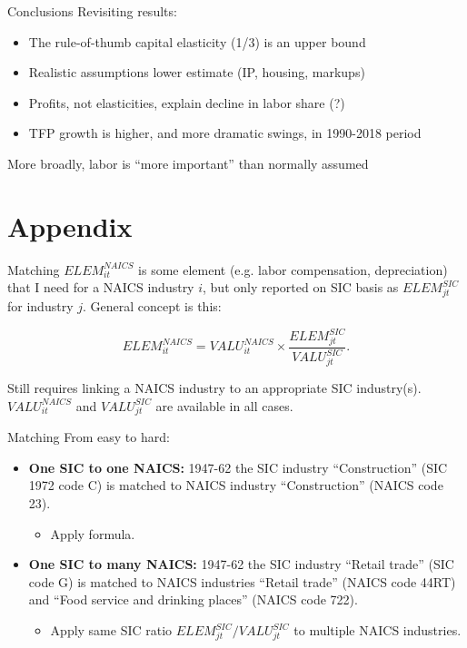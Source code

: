 \documentclass[10pt,xcolor=dvipsnames]{beamer}
\begin{document}
\begin{frame}{Conclusions}
Revisiting results:
\begin{itemize}
  \item The rule-of-thumb capital elasticity (1/3) is an upper bound
  \item Realistic assumptions lower estimate (IP, housing, markups)
  \item Profits, not elasticities, explain decline in labor share (?)
  \item TFP growth is higher, and more dramatic swings, in 1990-2018 period
\end{itemize}

\vspace{.25in}
More broadly, labor is ``more important'' than normally assumed
\end{frame}

\section{Appendix}

\begin{frame}{Matching}\label{Amatch}
$ELEM_{it}^{NAICS}$ is some element (e.g. labor compensation, depreciation) that I need for a NAICS industry $i$, but only reported on SIC basis as $ELEM_{jt}^{SIC}$ for industry $j$. General concept is this:

\begin{equation}
  ELEM_{it}^{NAICS} = VALU_{it}^{NAICS} \times \frac{ELEM_{jt}^{SIC}}{VALU_{jt}^{SIC}}. \label{EQ_match_app}
\end{equation}

Still requires linking a NAICS industry to an appropriate SIC industry(s). $VALU_{it}^{NAICS}$ and $VALU_{jt}^{SIC}$ are available in all cases.

\end{frame}

\begin{frame}{Matching}
From easy to hard:
\begin{itemize}
  \item \textbf{One SIC to one NAICS:} 1947-62 the SIC industry ``Construction'' (SIC 1972 code C) is matched to NAICS industry ``Construction'' (NAICS code 23). 
  \begin{itemize}
    \item Apply formula.
  \end{itemize}
  \item \textbf{One SIC to many NAICS:} 1947-62 the SIC industry ``Retail trade'' (SIC code G) is matched to NAICS industries ``Retail trade'' (NAICS code 44RT) and ``Food service and drinking places'' (NAICS code 722). 
  \begin{itemize}
    \item Apply same SIC ratio $ELEM_{jt}^{SIC}/VALU_{jt}^{SIC}$ to multiple NAICS industries. 
  \end{itemize}
\end{itemize}

\end{frame}
\end{document}
